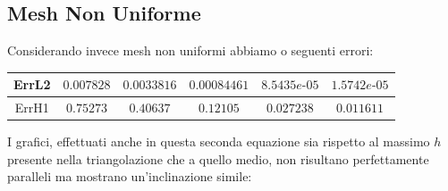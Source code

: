\documentclass[12pt,a4paper]{report}
\theoremstyle{theorem}
\theoremstyle{theorem}
\theoremstyle{definition}
\begin{document}
\subsection{Mesh Non Uniforme}
Considerando invece mesh non uniformi abbiamo o seguenti errori:
\hfill \\
\begin{table}[!h]
\centering
\begin{tabular}{ | c | c | c | c | c | c | }
\hline
ErrL2	&	$0.007828$ &	 $0.0033816$	 & $0.00084461$	 & $8.5435e\text{-}05$ & $1.5742e\text{-}05$ \\ \hline 
ErrH1	&	$0.75273$ &	 $0.40637$	 & $0.12105$	 & $0.027238$ & $0.011611$ \\ \hline
\end{tabular}
\end{table}

I grafici, effettuati anche in questa seconda equazione sia rispetto al massimo $h$ presente nella triangolazione che a quello medio, non risultano perfettamente paralleli ma mostrano un'inclinazione simile:
\end{document}
